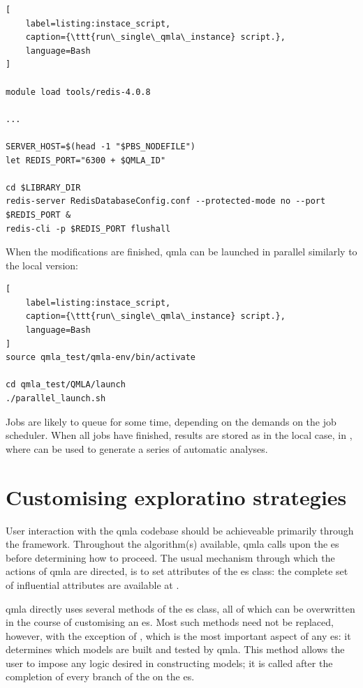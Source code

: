 \begin{lstlisting}[
    label=listing:instace_script,
    caption={\ttt{run\_single\_qmla\_instance} script.},
    language=Bash
]

module load tools/redis-4.0.8

... 

SERVER_HOST=$(head -1 "$PBS_NODEFILE")
let REDIS_PORT="6300 + $QMLA_ID"

cd $LIBRARY_DIR
redis-server RedisDatabaseConfig.conf --protected-mode no --port $REDIS_PORT & 
redis-cli -p $REDIS_PORT flushall

\end{lstlisting}

When the modifications are finished, 
    \gls{qmla} can be launched in parallel similarly to the local version: 

\begin{lstlisting}[
    label=listing:instace_script,
    caption={\ttt{run\_single\_qmla\_instance} script.},
    language=Bash
]
source qmla_test/qmla-env/bin/activate

cd qmla_test/QMLA/launch
./parallel_launch.sh

\end{lstlisting}
\par 

Jobs are likely to queue for some time, depending on the demands on the job scheduler. 
When all jobs have finished, results are stored as in the local case, 
    in ,
    where  can be used to generate a series of automatic analyses. 
\par 

\section{Customising exploratino strategies}
User interaction with the \gls{qmla} codebase should be achieveable primarily through the  framework. 
Throughout the algorithm(s) available, \gls{qmla} calls upon the \gls{es} before determining how to proceed. 
The usual mechanism through which the actions of \gls{qmla} are directed, 
    is to set attributes of the \gls{es} class:
    the complete set of influential attributes are available at \cite{qmla_docs}. 

\par 
\gls{qmla} directly uses several methods of the \gls{es} class, 
    all of which can be overwritten in the course of customising an \gls{es}. 
Most such methods need not be replaced, however, with the exception of , 
    which is the most important aspect of any \gls{es}: 
    it determines which models are built and tested by \gls{qmla}. 
This method allows the user to impose any logic desired in constructing models;
    it is called after the completion of every branch of the   on the \gls{es}. 
\par 

